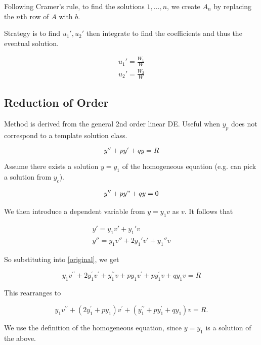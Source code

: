 Following Cramer's rule, to find the solutions $1,\ldots,n$, we create $A_n$ by replacing the $n$th row of $A$ with $b$.

Strategy is to find $u_1', u_2'$ then integrate to find the coefficients and thus the eventual solution.

\begin{eqnarray}
    u_1'=\frac{W_1}{W}\\
    u_2'=\frac{W_2}{W}
\end{eqnarray}

\subsection{Reduction of Order}

Method is derived from the general 2nd order linear DE. Useful when $y_p$ does not correspond to a template solution class.

\begin{equation}
    y''+py'+qy=R\label{original}
\end{equation}

Assume there exists a solution $y=y_1$ of the homogeneous equation (e.g. can pick a solution from $y_c$).

\begin{eqnarray}
    y''+py"+qy=0
\end{eqnarray}

We then introduce a dependent variable from $y=y_1v$ as $v$. It follows that

\begin{eqnarray}
    y'=y_1v'+y_1'v\\
    y''=y_1v''+2y_1'v'+y_1''v
\end{eqnarray}

So substituting into \ref{original}, we get

\begin{equation}
    y_{1} v^{\prime \prime}+2 y_{1}^{\prime} v^{\prime}+y_{1}^{\prime \prime} v+p y_{1} v^{\prime}+p y_{1}^{\prime} v+q y_{1} v=R
\end{equation}

This rearranges to

\begin{equation}
    y_{1} v^{\prime \prime}+\left(2 y_{1}^{\prime}+p y_{1}\right) v^{\prime}+\left(y_{1}^{\prime \prime}+p y_{1}^{\prime}+q y_{1}\right) v=R .
\end{equation}

We use the definition of the homogeneous equation, since $y=y_1$ is a solution of the above.

